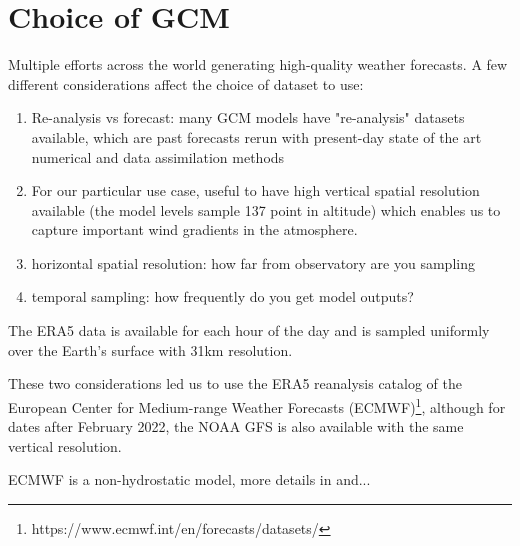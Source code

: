 \documentclass[twocolumn]{aastex631}
\begin{document}
\appendix
\section{Choice of GCM}\label{app:gcm}
Multiple efforts across the world generating high-quality weather forecasts. 
A few different considerations affect the choice of dataset to use:
\begin{enumerate}
    \item Re-analysis vs forecast: many GCM models have "re-analysis" datasets available, which are past forecasts rerun with present-day state of the art numerical and data assimilation methods
    \item For our particular use case, useful to have high vertical spatial resolution available (the model levels sample 137 point in altitude) which enables us to capture important wind gradients in the atmosphere.
    \item horizontal spatial resolution: how far from observatory are you sampling
    \item temporal sampling: how frequently do you get model outputs?
\end{enumerate}

The ERA5 data is available for each hour of the day and is sampled uniformly over the Earth's surface with 31km resolution. 

These two considerations led us to use the ERA5 reanalysis catalog of the European Center for Medium-range Weather Forecasts (ECMWF)\footnote{https://www.ecmwf.int/en/forecasts/datasets/}, although for dates after February 2022, the NOAA GFS is also available with the same vertical resolution.

ECMWF is a non-hydrostatic model, more details in \cite{osborn_atmospheric_2018} and...


{}



\end{document}
